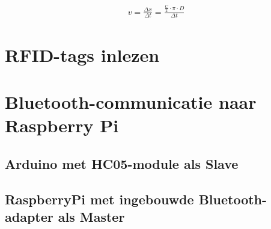 \begin{gather*}
v=\frac{\Delta x}{\Delta t} = \frac{\frac{C}{2}\cdot\pi\cdot D}{\Delta t}
\end{gather*}
\section{RFID-tags inlezen}
\section{Bluetooth-communicatie naar Raspberry Pi}
\subsection{Arduino met HC05-module als Slave}
\subsection{RaspberryPi met ingebouwde Bluetooth-adapter als Master}
